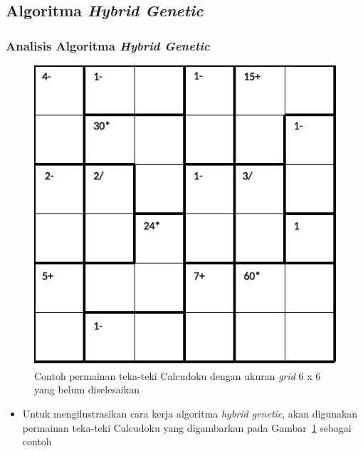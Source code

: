 \documentclass{beamer}
\begin{document}
\note{

}

\subsection{Algoritma \protect\textit{Hybrid Genetic}}

\begin{frame}
\frametitle{Analisis Algoritma \textit{Hybrid Genetic}}
\begin{figure}
\centering
\captionsetup{justification=centering}
\includegraphics[scale=0.33]{Gambar/hybridgenetic/Puzzle}
\caption[Contoh permainan teka-teki Calcudoku dengan ukuran \textit{grid} 6 x 6 yang belum diselesaikan]{Contoh permainan teka-teki Calcudoku dengan ukuran \textit{grid} 6 x 6 yang belum diselesaikan}
\label{fig:analisishg1}
\end{figure}
\begin{itemize}
\item Untuk mengilustrasikan cara kerja algoritma \textit{hybrid genetic}, akan digunakan permainan teka-teki Calcudoku yang digambarkan pada Gambar~\ref{fig:analisishg1} sebagai contoh
\end{itemize}
\end{frame}

\end{document}
